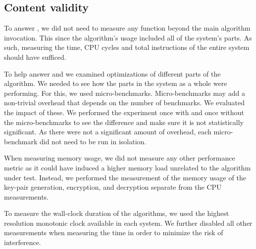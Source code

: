 

\subsection{Content validity}


To answer , we did not need to measure any function beyond the main algorithm invocation. This since the algorithm's usage included all of the system's parts. As such, measuring the time, CPU cycles and total instructions of the entire system should have sufficed.

To help answer  and  we examined optimizations of different parts of the algorithm. We needed to see how the parts in the system as a whole were performing. For this, we used micro-benchmarks. Micro-benchmarks may add a non-trivial overhead that depends on the number of benchmarks. We evaluated the impact of these. We performed the experiment once with and once without the micro-benchmarks to see the difference and make sure it is not statistically significant. As there were not a significant amount of overhead, each micro-benchmark did not need to be run in isolation.

When measuring memory usage, we did not measure any other performance metric as it could have induced a higher memory load unrelated to the algorithm under test. Instead, we performed the measurement of the memory usage of the key-pair generation, encryption, and decryption separate from the CPU measurements.

To measure the wall-clock duration of the algorithms, we used the highest resolution monotonic clock available in each system. We further disabled all other measurements when measuring the time in order to minimize the risk of interference.

